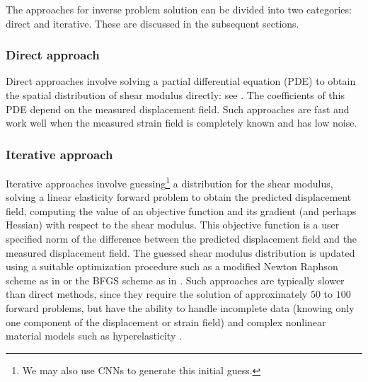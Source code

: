 \documentclass[12pt]{article}
\begin{document}
The approaches for inverse problem solution can be divided into two categories: direct and iterative. These are discussed in the subsequent sections.
\subsubsection{Direct approach} Direct approaches involve solving a partial differential equation (PDE) to obtain the spatial distribution of shear modulus directly: see \cite{paper:raghavan1994,paper:barboneadjwt,paper:albocher}. The coefficients of this PDE depend on the measured displacement field. Such approaches are fast and work well when the measured strain field is completely known and has low noise.
\subsubsection{Iterative approach} Iterative approaches \cite{paper:oberai2003,paper:oberaipmb2004,paper:gokhale2008,paper:kallel1996,paper:doyley,paper:goenezen2011} involve guessing\footnote{We may also use CNNs to generate this initial guess.} a distribution for the shear modulus, solving a linear elasticity forward problem to obtain the predicted displacement field, computing the value of an objective function and its gradient (and perhaps Hessian) with respect to the shear modulus. This objective function is a user specified norm of the difference between the predicted displacement field and the measured displacement field. The guessed shear modulus distribution is updated using a suitable optimization procedure such as a modified Newton Raphson scheme as in \cite{paper:doyley,paper:kallel1996} or the BFGS scheme as in \cite{paper:gokhale2008,paper:oberaipmb2004,paper:oberai2003,paper:goenezen2011,paper:richards2009,diss:gokhale2007}. Such approaches are typically slower than direct methods, since they require the solution of approximately $50$ to $100$ forward problems, but have the ability to handle incomplete data (knowing only one component of the displacement or strain field) and complex nonlinear material models such as hyperelasticity \cite{paper:gokhale2008,paper:goenezen2011}.
\end{document}
